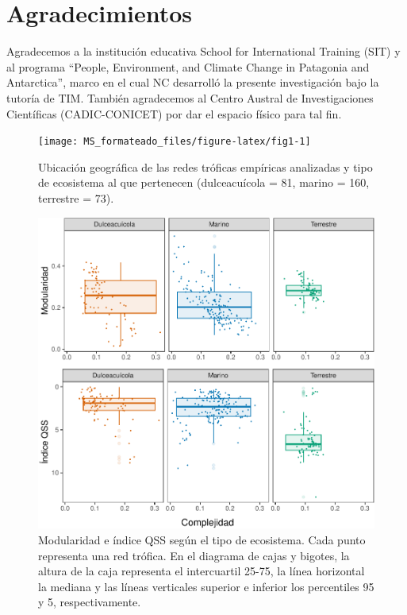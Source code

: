 \documentclass[
]{article}
\begin{document}
\hypertarget{agradecimientos}{%
\section{Agradecimientos}\label{agradecimientos}}

Agradecemos a la institución educativa School for International Training
(SIT) y al programa ``People, Environment, and Climate Change in
Patagonia and Antarctica'', marco en el cual NC desarrolló la presente
investigación bajo la tutoría de TIM. También agradecemos al Centro
Austral de Investigaciones Científicas (CADIC-CONICET) por dar el
espacio físico para tal fin.

\newpage
\begin{figure}

{\centering \texttt{[image: MS\_formateado\_files/figure-latex/fig1-1]} 

}

\caption{Ubicación geográfica de las redes tróficas empíricas analizadas y tipo de ecosistema al que pertenecen (dulceacuícola = 81, marino = 160, terrestre = 73).}\label{fig:fig1}
\end{figure}

\newpage
\begin{figure}

{\centering \includegraphics{MS_formateado_files/figure-latex/fig2-1} 

}

\caption{Modularidad e índice QSS según el tipo de ecosistema. Cada punto representa una red trófica. En el diagrama de cajas y bigotes, la altura de la caja representa el intercuartil 25-75, la línea horizontal la mediana y las líneas verticales superior e inferior los percentiles 95 y 5, respectivamente.}\label{fig:fig2}
\end{figure}
\end{document}
